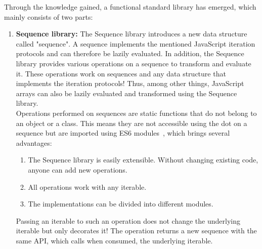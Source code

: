 Through the knowledge gained, a functional standard library has emerged, which
mainly consists of two parts:\\
\begin{enumerate}
  \item \textbf{Sequence library:} The Sequence library introduces a new data
    structure called "sequence". A sequence implements the mentioned JavaScript
    iteration protocols and can therefore be lazily evaluated. In addition, the
    Sequence library provides various operations on a sequence to transform and
    evaluate it. These operations work on sequences and any data structure that
    implements the iteration protocols! Thus, among other things, JavaScript
    arrays can also be lazily evaluated and transformed using the Sequence
    library.\\
    Operations performed on sequences are static functions that do not belong
    to an object or a class. This means they are not accessible using the dot
    on a sequence but are imported using ES6 modules~\cite{mdn_modules_2023},
    which brings several advantages:
      \begin{enumerate}
        \item The Sequence library is easily extensible. Without changing existing
          code, anyone can add new operations.
        \item All operations work with any iterable.
        \item The implementations can be divided into different modules.
      \end{enumerate}
  Passing an iterable to such an operation does not change the underlying
  iterable but only decorates it! The operation returns a new sequence with the
  same API, which calls when consumed, the underlying iterable.


\end{enumerate}
